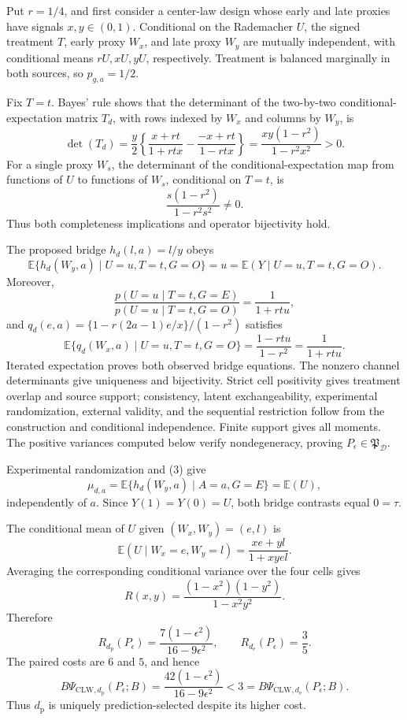 Put \(r=1/4\), and first consider a center-law design whose early and late proxies have signals \(x,y\in(0,1)\).  Conditional on the Rademacher \(U\), the signed treatment \(T\), early proxy \(W_x\), and late proxy \(W_y\) are mutually independent, with conditional means \(rU,xU,yU\), respectively.  Treatment is balanced marginally in both sources, so \(p_{g,a}=1/2\).

Fix \(T=t\).  Bayes' rule shows that the determinant of the two-by-two conditional-expectation matrix \(T_d\), with rows indexed by \(W_x\) and columns by \(W_y\), is
\[
\det(T_d)=\frac y2\left\{
\frac{x+rt}{1+rtx}-\frac{-x+rt}{1-rtx}\right\}
=\frac{xy(1-r^2)}{1-r^2x^2}>0.                                    \tag{1}
\]
For a single proxy \(W_s\), the determinant of the conditional-expectation map from functions of \(U\) to functions of \(W_s\), conditional on \(T=t\), is
\[
\frac{s(1-r^2)}{1-r^2s^2}\ne0.                                   \tag{2}
\]
Thus both completeness implications and operator bijectivity hold.

The proposed bridge \(h_d(l,a)=l/y\) obeys
\[
\mathbb E\{h_d(W_y,a)\mid U=u,T=t,G=O\}=u
=\mathbb E(Y\mid U=u,T=t,G=O).                                    \tag{3}
\]
Moreover,
\[
\frac{p(U=u\mid T=t,G=E)}{p(U=u\mid T=t,G=O)}
=\frac1{1+rtu},                                                     \tag{4}
\]
and \(q_d(e,a)=\{1-r(2a-1)e/x\}/(1-r^2)\) satisfies
\[
\mathbb E\{q_d(W_x,a)\mid U=u,T=t,G=O\}
=\frac{1-rtu}{1-r^2}=\frac1{1+rtu}.                               \tag{5}
\]
Iterated expectation proves both observed bridge equations.  The nonzero channel determinants give uniqueness and bijectivity.  Strict cell positivity gives treatment overlap and source support; consistency, latent exchangeability, experimental randomization, external validity, and the sequential restriction follow from the construction and conditional independence.  Finite support gives all moments.  The positive variances computed below verify nondegeneracy, proving \(P_\epsilon\in\mathfrak P_{\mathcal D}\).

Experimental randomization and (3) give
\[
\mu_{d,a}=\mathbb E\{h_d(W_y,a)\mid A=a,G=E\}=\mathbb E(U),       \tag{6}
\]
independently of \(a\).  Since \(Y(1)=Y(0)=U\), both bridge contrasts equal \(0=\tau\).

The conditional mean of \(U\) given \((W_x,W_y)=(e,l)\) is
\[
\mathbb E(U\mid W_x=e,W_y=l)=\frac{xe+yl}{1+xyel}.
\]
Averaging the corresponding conditional variance over the four cells gives
\[
R(x,y)=\frac{(1-x^2)(1-y^2)}{1-x^2y^2}.                            \tag{7}
\]
Therefore
\[
R_{d_{\mathrm p}}(P_\epsilon)
=\frac{7(1-\epsilon^2)}{16-9\epsilon^2},
\qquad R_{d_{\mathrm e}}(P_\epsilon)=\frac35.                    \tag{8}
\]
The paired costs are \(6\) and \(5\), and hence
\[
B\Psi_{\mathrm{CLW},d_{\mathrm p}}(P_\epsilon;B)
=\frac{42(1-\epsilon^2)}{16-9\epsilon^2}<3
=B\Psi_{\mathrm{CLW},d_{\mathrm e}}(P_\epsilon;B).              \tag{9}
\]
Thus \(d_{\mathrm p}\) is uniquely prediction-selected despite its higher cost.

